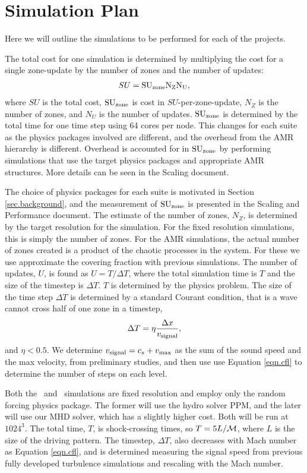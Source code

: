 \section{Simulation Plan}
\label{sec.plan}

Here we will outline the simulations to be performed for each of the projects.

The total cost for one simulation is determined by multiplying the cost for a
single zone-update by the number of zones and the number of updates:
\begin{align}
SU = \rm{SU}_{\rm{zone}} N_Z N_U,
\end{align}
where $SU$ is the total cost, $\rm{SU}_{\rm{zone}}$ is cost in
$SU$-per-zone-update, $N_Z$ is the number of zones, and $N_U$ is the number of
updates.
$\rm{SU}_{\rm{zone}}$ is determined by the total time for one time step using 64 cores per
node.  This changes for each suite as the physics packages involved are
different, and the overhead from the AMR hierarchy is different.  Overhead is
accounted for in $\rm{SU}_{\rm{zone}}$ by performing simulations that use the target physics
packages and appropriate AMR structures.  More details can be seen in the
Scaling document.

The choice of physics packages for each suite is motivated
in Section \ref{sec.background}, and the measurement of $\rm{SU}_{\rm{zone}}$ is presented in
the Scaling and Performance document.  The estimate of the number of zones, $N_Z$,
is determined by the target resolution for the simulation.  For the fixed
resolution simulations, this is simply the number of zones.  For the AMR
simulations, the actual number of zones created is a product of the chaotic
processes in the system.  For these we use approximate the covering fraction
with previous simulations.
The number of updates, $U$, is found as
$U=T/\Delta T$, where the total simulation time is $T$ and the size of the
timestep is $\Delta T$.  $T$ is determined by the physics
problem.  The size of the time step $\Delta T$ is
determined by a standard Courant condition, that is a wave cannot cross half of
one zone in a timestep, 
\begin{align}
\Delta T = \eta \frac{\Delta
x}{v_{\rm{signal}}}, \label{eqn.cfl}
\end{align}
and $\eta < 0.5$.  We determine $v_{\rm{signal}}=c_s+v_{\rm{max}}$
 as the sum of the sound speed and the max velocity, from preliminary studies, and then use use Equation \ref{eqn.cfl} to
determine the number of steps on each level.

Both the \nameTurbulence\ and \nameCMB\ simulations are fixed resolution and
employ only the random forcing physics package.  The former will use the hydro solver
PPM, and the later will use our MHD solver, which has a slightly higher cost.  Both will be
run at $1024^3$.  The total time, $T$, is  shock-crossing times, so $T =
5 L/\mathcal{M}$, where $L$ is the size of the driving pattern.  The
timestep, $\Delta T$, also decreases with Mach number as Equation \ref{eqn.cfl},
and is determined measuring the signal speed \vsignal from
previous fully developed turbulence simulations and rescaling with the Mach
number.

